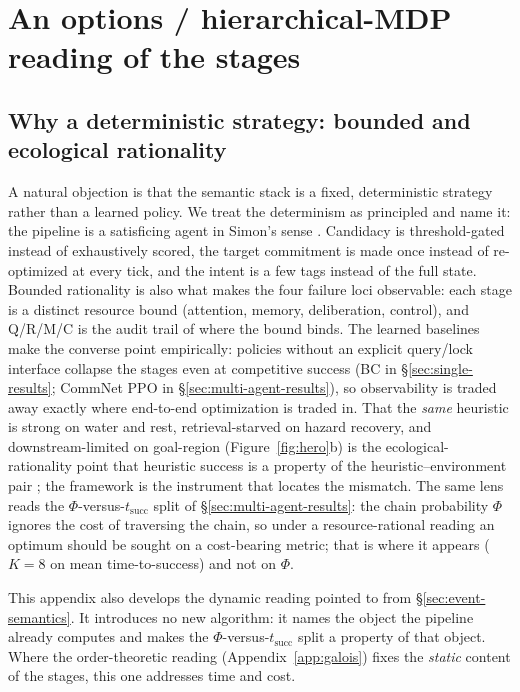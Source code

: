 \documentclass{article}
\begin{document}
\section{An options / hierarchical-MDP reading of the stages}
\label{app:hmdp}

\subsection*{Why a deterministic strategy: bounded and ecological rationality}
A natural objection is that the semantic stack is a fixed, deterministic strategy rather than a learned policy. We treat the determinism as principled and name it: the pipeline is a satisficing agent in Simon's sense \citep{simon1955behavioral,simon1956rational}. Candidacy is threshold-gated instead of exhaustively scored, the target commitment is made once instead of re-optimized at every tick, and the intent is a few tags instead of the full state. Bounded rationality is also what makes the four failure loci observable: each stage is a distinct resource bound (attention, memory, deliberation, control), and Q/R/M/C is the audit trail of where the bound binds. The learned baselines make the converse point empirically: policies without an explicit query/lock interface collapse the stages even at competitive success (BC in \S\ref{sec:single-results}; CommNet PPO in \S\ref{sec:multi-agent-results}), so observability is traded away exactly where end-to-end optimization is traded in. That the \emph{same} heuristic is strong on water and rest, retrieval-starved on hazard recovery, and downstream-limited on goal-region (Figure~\ref{fig:hero}b) is the ecological-rationality point that heuristic success is a property of the heuristic--environment pair \citep{simon1956rational,gigerenzer1996reasoning}; the framework is the instrument that locates the mismatch. The same lens reads the $\Phi$-versus-$t_{\mathrm{succ}}$ split of \S\ref{sec:multi-agent-results}: the chain probability $\Phi$ ignores the cost of traversing the chain, so under a resource-rational reading \citep{lieder2020resource} an optimum should be sought on a cost-bearing metric; that is where it appears ($K{=}8$ on mean time-to-success) and not on $\Phi$.

This appendix also develops the dynamic reading pointed to from
\S\ref{sec:event-semantics}. It introduces no new algorithm: it names the
object the pipeline already computes and makes the
$\Phi$-versus-$t_{\mathrm{succ}}$ split a property of that object. Where the
order-theoretic reading (Appendix~\ref{app:galois}) fixes the \emph{static}
content of the stages, this one addresses time and cost.
\end{document}
